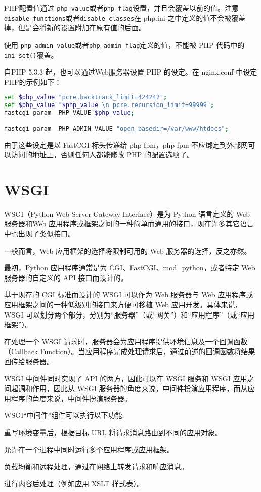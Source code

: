 PHP配置值通过 \texttt{php\_value}或者\texttt{php\_flag}设置，并且会覆盖以前的值。注意\texttt{disable\_functions}或者\texttt{disable\_classes}在 php.ini 之中定义的值不会被覆盖掉，但是会将新的设置附加在原有值的后面。

使用 \texttt{php\_admin\_value}或者\texttt{php\_admin\_flag}定义的值，不能被 PHP 代码中的 \texttt{ini\_set()}覆盖。

自PHP 5.3.3 起，也可以通过Web服务器设置 PHP 的设定。在 nginx.conf 中设定 PHP的示例如下：

\begin{lstlisting}[language=bash]
set $php_value "pcre.backtrack_limit=424242";
set $php_value "$php_value \n pcre.recursion_limit=99999";
fastcgi_param  PHP_VALUE $php_value;

fastcgi_param  PHP_ADMIN_VALUE "open_basedir=/var/www/htdocs";
\end{lstlisting}

由于这些设定是以 FastCGI 标头传递给 php-fpm，php-fpm 不应绑定到外部网可以访问的地址上，否则任何人都能修改 PHP 的配置选项了。



\section{WSGI}

WSGI（Python Web Server Gateway Interface）是为 Python 语言定义的 Web 服务器和Web 应用程序或框架之间的一种简单而通用的接口，现在许多其它语言中也出现了类似接口。

一般而言，Web 应用框架的选择将限制可用的 Web 服务器的选择，反之亦然。

最初，Python 应用程序通常是为 CGI、FastCGI、mod_python，或者特定 Web 服务器的自定义的 API 接口而设计的。

基于现存的 CGI 标准而设计的 WSGI 可以作为 Web 服务器与 Web 应用程序或应用框架之间的一种低级别的接口来方便可移植 Web 应用开发。具体来说，WSGI 可以划分两个部分，分别为“服务器”（或“网关”）和“应用程序”（或“应用框架”）。

在处理一个 WSGI 请求时，服务器会为应用程序提供环境信息及一个回调函数（Callback Function）。当应用程序完成处理请求后，通过前述的回调函数将结果回传给服务器。

WSGI 中间件同时实现了 API 的两方，因此可以在 WSGI 服务和 WSGI 应用之间起调和作用，因此从 WSGI 服务器的角度来说，中间件扮演应用程序，而从应用程序的角度来说，中间件扮演服务器。

WSGI“中间件”组件可以执行以下功能:

\begin{compactitem}
\item 重写环境变量后，根据目标 URL 将请求消息路由到不同的应用对象。
\item 允许在一个进程中同时运行多个应用程序或应用框架。
\item 负载均衡和远程处理，通过在网络上转发请求和响应消息。
\item 进行内容后处理（例如应用 XSLT 样式表）。
\end{compactitem}

